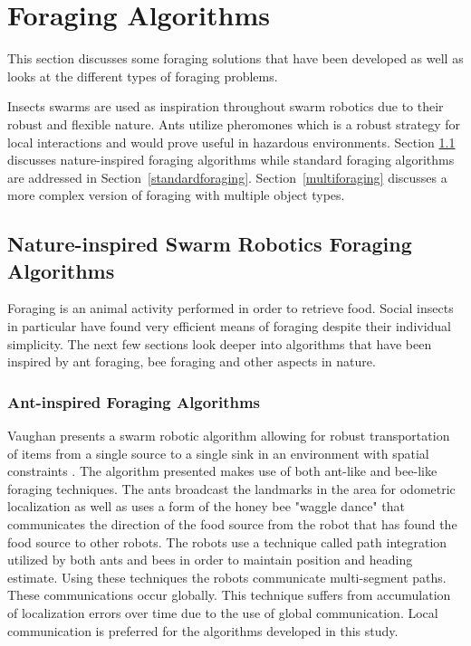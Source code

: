 \section{Foraging Algorithms}
\label{sec:second:existingsolution}

This section discusses some foraging solutions that have been developed as well as looks at the different types of foraging problems. 

Insects swarms are used as inspiration throughout swarm robotics due to their robust and flexible nature. Ants utilize pheromones which is a robust strategy for local interactions and would prove useful in hazardous environments. Section \ref{sec:second:natureinspired} discusses nature-inspired foraging algorithms while standard foraging algorithms are addressed in Section~\ref{standardforaging}. Section~\ref{multiforaging} discusses a more complex version of foraging with multiple object types. 
 
\subsection{Nature-inspired Swarm Robotics Foraging Algorithms}
\label{sec:second:natureinspired}

Foraging is an animal activity performed in order to retrieve food. Social insects in particular have found very efficient means of foraging despite their individual simplicity. The next few sections look deeper into algorithms that have been inspired by ant foraging, bee foraging and other aspects in nature. 

\subsubsection{Ant-inspired Foraging Algorithms}

Vaughan presents a swarm robotic algorithm allowing for robust transportation of items from a single source to a single sink in an environment with spatial constraints \cite{vaughan2000blazing}. The algorithm presented makes use of both ant-like and bee-like foraging techniques. The ants broadcast the landmarks in the area for odometric localization as well as uses a form of the  honey bee "waggle dance" that communicates the direction of the food source from the robot that has found the food source to other robots. The robots use a technique called path integration utilized by both ants and bees in order to maintain position and heading estimate. Using these techniques the robots communicate multi-segment paths. These communications occur globally. This technique suffers from accumulation of localization errors over time due to the use of global communication. Local communication is preferred for the algorithms developed in this study.   %


